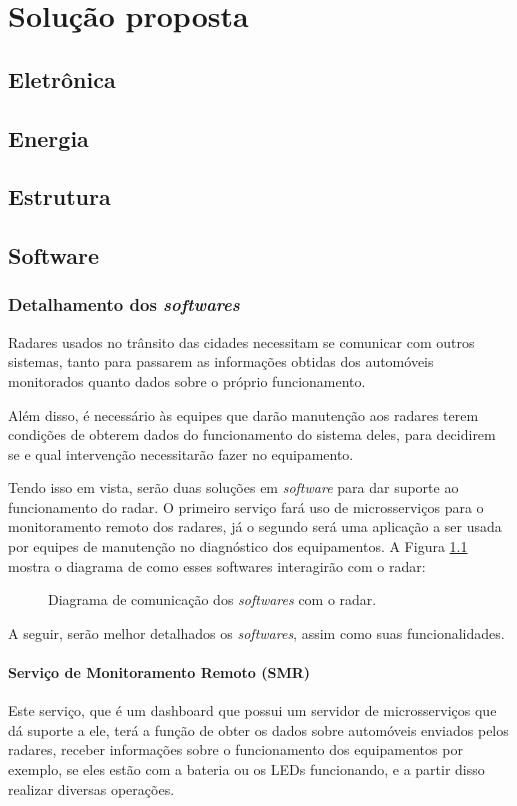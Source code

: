 \chapter{Solução proposta}
\section{Eletrônica}
\section{Energia}
\section{Estrutura}
\section{Software}

\subsection{Detalhamento dos \emph{softwares}}
Radares usados no trânsito das cidades necessitam se comunicar com outros sistemas, tanto para passarem as informações obtidas dos automóveis monitorados quanto dados sobre o próprio funcionamento.

Além disso, é necessário às equipes que darão manutenção aos radares terem condições de obterem dados do funcionamento do sistema deles, para decidirem se e qual intervenção necessitarão fazer no equipamento.

Tendo isso em vista, serão duas soluções em \emph{software} para dar suporte ao funcionamento do radar. O primeiro serviço fará uso de microsserviços para o monitoramento remoto dos radares, já o segundo será uma aplicação a ser usada por equipes de manutenção no diagnóstico dos equipamentos. A Figura \ref{fig:diagrama-in-out-software} mostra o diagrama de como esses softwares interagirão com o radar:

\begin{figure}[!htb]
    \caption{\label{fig:diagrama-in-out-software} Diagrama de comunicação dos \emph{softwares} com o radar.}
\end{figure}

 A seguir, serão melhor detalhados os \emph{softwares}, assim como suas funcionalidades.

\subsubsection{Serviço de Monitoramento Remoto (SMR)}
Este serviço, que é um dashboard que possui um servidor de microsserviços que dá suporte a ele, terá a função de obter os dados sobre automóveis enviados pelos radares, receber informações sobre o funcionamento dos equipamentos por exemplo, se eles estão com a bateria ou os LEDs funcionando, e a partir disso realizar diversas operações.

